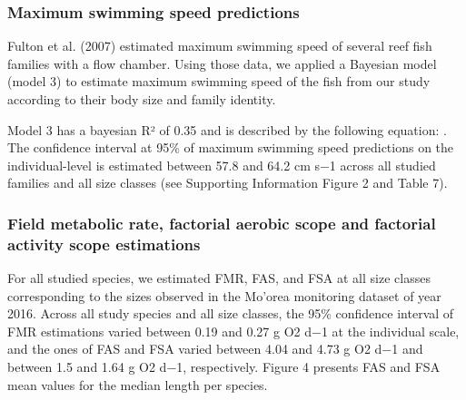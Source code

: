 \documentclass[12pt,a4paper]{article}
\begin{document}
\hypertarget{maximum-swimming-speed-predictions}{%
\subsubsection{Maximum swimming speed
predictions}\label{maximum-swimming-speed-predictions}}

\noindent Fulton et al. (2007) estimated maximum swimming speed of
several reef fish families with a flow chamber. Using those data, we
applied a Bayesian model (model 3) to estimate maximum swimming speed of
the fish from our study according to their body size and family
identity.

\noindent Model 3 has a bayesian R² of 0.35 and is described by the
following equation: . The confidence interval at 95\% of maximum
swimming speed predictions on the individual-level is estimated between
57.8 and 64.2 cm s−1 across all studied families and all size classes
(see Supporting Information Figure 2 and Table 7).

\hypertarget{field-metabolic-rate-factorial-aerobic-scope-and-factorial-activity-scope-estimations}{%
\subsubsection{Field metabolic rate, factorial aerobic scope and
factorial activity scope
estimations}\label{field-metabolic-rate-factorial-aerobic-scope-and-factorial-activity-scope-estimations}}

\noindent  For all studied species, we estimated FMR, FAS, and FSA at
all size classes corresponding to the sizes observed in the Mo'orea
monitoring dataset of year 2016. Across all study species and all size
classes, the 95\% confidence interval of FMR estimations varied between
0.19 and 0.27 g O2 d−1 at the individual scale, and the ones of FAS and
FSA varied between 4.04 and 4.73 g O2 d−1 and between 1.5 and 1.64 g O2
d−1, respectively. Figure 4 presents FAS and FSA mean values for the
median length per species.
\end{document}
